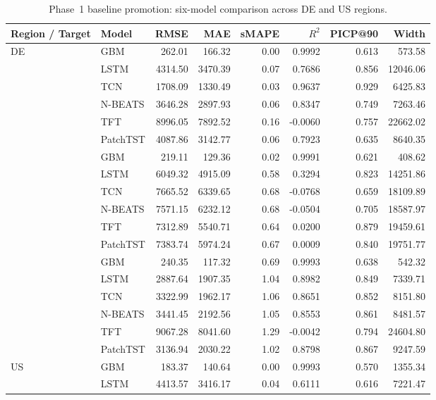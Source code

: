 \begin{table}[htbp]
\centering\small
\caption{Phase~1 baseline promotion: six-model comparison across DE and US regions.}
\label{tab:phase1_baseline}
\begin{tabular}{llrrrrrr}
\toprule
Region / Target & Model & RMSE & MAE & sMAPE & $R^2$ & PICP@90 & Width \\
\midrule
  \multirow{18}{*}{DE} & GBM & 262.01 & 166.32 & 0.00 & 0.9992 & 0.613 & 573.58 \\
   & LSTM & 4314.50 & 3470.39 & 0.07 & 0.7686 & 0.856 & 12046.06 \\
   & TCN & 1708.09 & 1330.49 & 0.03 & 0.9637 & 0.929 & 6425.83 \\
   & N-BEATS & 3646.28 & 2897.93 & 0.06 & 0.8347 & 0.749 & 7263.46 \\
   & TFT & 8996.05 & 7892.52 & 0.16 & -0.0060 & 0.757 & 22662.02 \\
   & PatchTST & 4087.86 & 3142.77 & 0.06 & 0.7923 & 0.635 & 8640.35 \\
\cmidrule(lr){2-8}
   Wind & GBM & 219.11 & 129.36 & 0.02 & 0.9991 & 0.621 & 408.62 \\
   & LSTM & 6049.32 & 4915.09 & 0.58 & 0.3294 & 0.823 & 14251.86 \\
   & TCN & 7665.52 & 6339.65 & 0.68 & -0.0768 & 0.659 & 18109.89 \\
   & N-BEATS & 7571.15 & 6232.12 & 0.68 & -0.0504 & 0.705 & 18587.97 \\
   & TFT & 7312.89 & 5540.71 & 0.64 & 0.0200 & 0.879 & 19459.61 \\
   & PatchTST & 7383.74 & 5974.24 & 0.67 & 0.0009 & 0.840 & 19751.77 \\
\cmidrule(lr){2-8}
   Solar & GBM & 240.35 & 117.32 & 0.69 & 0.9993 & 0.638 & 542.32 \\
   & LSTM & 2887.64 & 1907.35 & 1.04 & 0.8982 & 0.849 & 7339.71 \\
   & TCN & 3322.99 & 1962.17 & 1.06 & 0.8651 & 0.852 & 8151.80 \\
   & N-BEATS & 3441.45 & 2192.56 & 1.05 & 0.8553 & 0.861 & 8481.57 \\
   & TFT & 9067.28 & 8041.60 & 1.29 & -0.0042 & 0.794 & 24604.80 \\
   & PatchTST & 3136.94 & 2030.22 & 1.02 & 0.8798 & 0.867 & 9247.59 \\
\midrule
  \multirow{18}{*}{US} & GBM & 183.37 & 140.64 & 0.00 & 0.9993 & 0.570 & 1355.34 \\
   & LSTM & 4413.57 & 3416.17 & 0.04 & 0.6111 & 0.616 & 7221.47 \\

\end{tabular}
\end{table}
